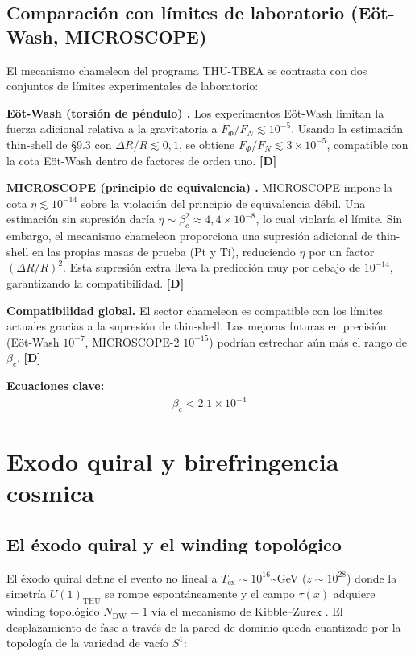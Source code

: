 ﻿\documentclass[11pt,letterpaper]{article}
\begin{document}
\subsection{Comparación con límites de laboratorio (Eöt-Wash, MICROSCOPE)}
El mecanismo chameleon del programa THU-TBEA se contrasta con dos conjuntos de límites experimentales de laboratorio:

\textbf{Eöt-Wash (torsión de péndulo) \cite{EotWash2015}.} Los experimentos Eöt-Wash limitan la fuerza adicional relativa a la gravitatoria a $F_\Phi/F_N \lesssim 10^{-5}$. Usando la estimación thin-shell de §9.3 con $\Delta R/R \lesssim 0{,}1$, se obtiene $F_\Phi/F_N \lesssim 3 \times 10^{-5}$, compatible con la cota Eöt-Wash dentro de factores de orden uno. \textbf{[D]}

\textbf{MICROSCOPE (principio de equivalencia) \cite{PernotBorras2021}.} MICROSCOPE impone la cota $\eta \lesssim 10^{-14}$ sobre la violación del principio de equivalencia débil. Una estimación sin supresión daría $\eta \sim \beta_c^2 \approx 4{,}4 \times 10^{-8}$, lo cual violaría el límite. Sin embargo, el mecanismo chameleon proporciona una supresión adicional de thin-shell en las propias masas de prueba (Pt y Ti), reduciendo $\eta$ por un factor $(\Delta R/R)^2$. Esta supresión extra lleva la predicción muy por debajo de $10^{-14}$, garantizando la compatibilidad. \textbf{[D]}

\textbf{Compatibilidad global.} El sector chameleon es compatible con los límites actuales gracias a la supresión de thin-shell. Las mejoras futuras en precisión (Eöt-Wash $10^{-7}$, MICROSCOPE-2 $10^{-15}$) podrían estrechar aún más el rango de $\beta_c$. \textbf{[D]}

\textbf{Ecuaciones clave:}
\begin{align*}
    \beta_c < 2.1\times 10^{-4}
\end{align*}
\section{Exodo quiral y birefringencia cosmica}
\subsection{El éxodo quiral y el winding topológico}
El éxodo quiral define el evento no lineal a $T_{\text{ex}} \sim 10^{16}$\textasciitilde{}GeV ($z \sim 10^{28}$) donde la simetría $U(1)_{\text{THU}}$ se rompe espontáneamente y el campo $\tau(x)$ adquiere winding topológico $N_{\text{DW}} = 1$ vía el mecanismo de Kibble--Zurek \cite{Kibble1961,Zurek1985}. El desplazamiento de fase a través de la pared de dominio queda cuantizado por la topología de la variedad de vacío $S^1$:
\end{document}
